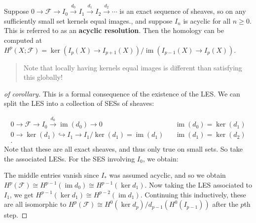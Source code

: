 \begin{corollary}[of theorem]

Suppose
\(0 \to \mathcal{F}\to I_0 \xrightarrow{d_0} I_1 \xrightarrow{d_1} I_2 \xrightarrow{d_2} \cdots\)
is an exact sequence of sheaves, so on any sufficiently small set
kernels equal images., and suppose \(I_n\) is acyclic for all
\(n\geq 0\). This is referred to as an \textbf{acyclic resolution}. Then
the homology can be computed at
\(H^p(X; \mathcal{F}) = \ker (I_p(X) \to I_{p+1}(X)) / \operatorname{im}(I_{p-1}(X) \to I_p(X) )\).

\begin{quote}
Note that locally having kernels equal images is different than
satisfying this globally!
\end{quote}

\end{corollary}

\begin{proof}[of corollary]

This is a formal consequence of the existence of the LES. We can split
the LES into a collection of SESs of sheaves:

\begin{align*}
0 \to \mathcal{F}\to I_0 \xrightarrow{d_0} \operatorname{im}(d_0) \to 0 && \operatorname{im}(d_0) = \ker(d_1) \\ 
0 \to \ker(d_1) \hookrightarrow I_1 \to I_1/\ker (d_1) = \operatorname{im}(d_1) && \operatorname{im}(d_1) = \ker(d_2) \\ 
.\end{align*}
Note that these are all exact sheaves, and thus only true on small sets.
So take the associated LESs. For the SES involving \(I_0\), we obtain:

\begin{center}
\end{center}

The middle entries vanish since \(I_*\) was assumed acyclic, and so we
obtain
\(H^p(\mathcal{F}) \cong H^{p-1}(\operatorname{im}d_0) \cong H^{p-1}(\ker d_1)\).
Now taking the LES associated to \(I_1\), we get
\(H^{p-1}(\ker d_1) \cong H^{p-2}(\operatorname{im}d_1)\). Continuing
this inductively, these are all isomorphic to
\(H^p(\mathcal{F}) \cong H^0(\ker d_p)/ d_{p-1}(H^0(I_{p-1}))\) after
the \(p\)th step.

\end{proof}

